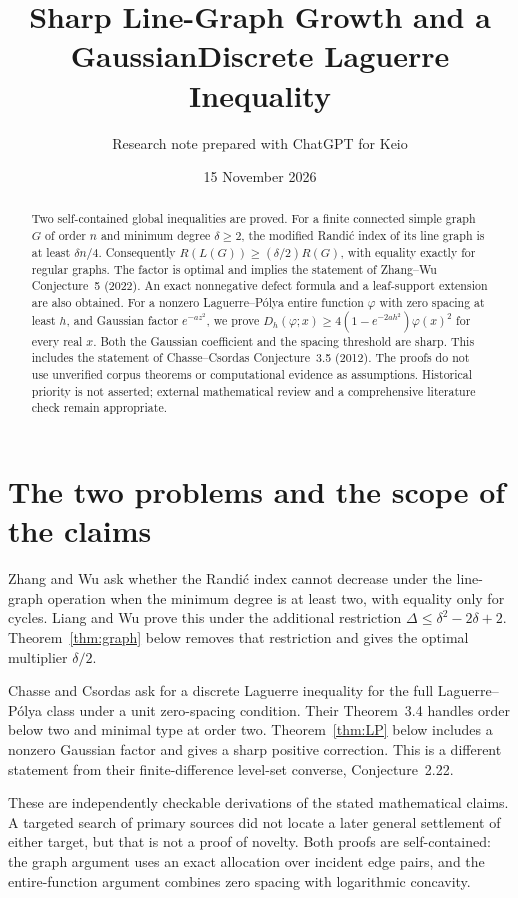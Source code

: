 \documentclass[11pt]{article}
\title{\textbf{Sharp Line-Graph Growth and a Gaussian\newline Discrete Laguerre Inequality}}
\author{Research note prepared with ChatGPT for Keio}
\date{15 November 2026}
\theoremstyle{remark}\newtheorem{remark}[theorem]{Remark}
\begin{document}
\maketitle
\begin{abstract}
Two self-contained global inequalities are proved. For a finite connected
simple graph $G$ of order $n$ and minimum degree $\delta\ge2$, the modified
Randi\'c index of its line graph is at least $\delta n/4$. Consequently
$R(L(G))\ge(\delta/2)R(G)$, with equality exactly for regular graphs.
The factor is optimal and implies the statement of Zhang--Wu Conjecture~5
(2022). An exact nonnegative defect formula and a leaf-support extension
are also obtained. For a nonzero Laguerre--P\'olya entire function $\varphi$
with zero spacing at least $h$, and Gaussian factor $e^{-az^2}$, we prove
$D_h(\varphi;x)\ge4(1-e^{-2ah^2})\varphi(x)^2$ for every real $x$.
Both the Gaussian coefficient and the spacing threshold are sharp.
This includes the statement of Chasse--Csordas Conjecture~3.5 (2012).
The proofs do not use unverified corpus theorems or computational evidence
as assumptions. Historical priority is not asserted; external mathematical
review and a comprehensive literature check remain appropriate.
\end{abstract}

\section{The two problems and the scope of the claims}

Zhang and Wu \cite[Conjecture~5]{ZW} ask whether the Randi\'c index cannot
decrease under the line-graph operation when the minimum degree is at
least two, with equality only for cycles. Liang and Wu
\cite[Theorem~1.4]{LW} prove this under the additional restriction
$\Delta\le\delta^2-2\delta+2$. Theorem~\ref{thm:graph} below removes that
restriction and gives the optimal multiplier $\delta/2$.

Chasse and Csordas \cite[Conjecture~3.5]{CC} ask for a discrete Laguerre
inequality for the full Laguerre--P\'olya class under a unit zero-spacing
condition. Their Theorem~3.4 handles order below two and minimal type at
order two. Theorem~\ref{thm:LP} below includes a nonzero Gaussian factor
and gives a sharp positive correction. This is a different statement
from their finite-difference level-set converse, Conjecture~2.22.

These are independently checkable derivations of the stated mathematical
claims. A targeted search of primary sources did not locate a later
general settlement of either target, but that is not a proof of novelty.
Both proofs are self-contained: the graph argument uses an exact allocation
over incident edge pairs, and the entire-function argument combines zero
spacing with logarithmic concavity.
\end{document}
